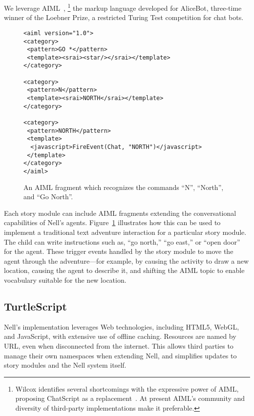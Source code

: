 \documentclass{acm_proc_article-sp}
\begin{document}
We leverage AIML~\cite{aiml:2005},%
\footnote{Wilcox identifies several shortcomings with the expressive
  power of AIML, proposing ChatScript as a
  replacement~\cite{wilcox:2010}.  At present AIML's community and
  diversity of third-party implementations make it preferable.}
the markup language developed for AliceBot, three-time winner of the
Loebner Prize, a restricted Turing Test competition for chat bots.

\begin{figure}
\begin{verbatim}
<aiml version="1.0">
<category>
 <pattern>GO *</pattern>
 <template><srai><star/></srai></template>
</category>

<category>
 <pattern>N</pattern>
 <template><srai>NORTH</srai></template>
</category>

<category>
 <pattern>NORTH</pattern>
 <template>
  <javascript>FireEvent(Chat, "NORTH")</javascript>
 </template>
</category>
</aiml>
\end{verbatim}
\caption{An AIML fragment which recognizes the commands ``N'',
  ``North'', and ``Go North''.}\label{fig:aiml}
\end{figure}
Each story module can include AIML fragments extending the
conversational capabilities of Nell's agents.  Figure~\ref{fig:aiml}
illustrates how this can be used to implement a traditional
text adventure interaction for a particular story module.
The child can write instructions such as, ``go north,'' ``go
east,'' or ``open door'' for the agent.  These trigger events
handled by the story module to move the agent through the
adventure---for example, by causing the activity to draw a
new location, causing the agent to describe it, and shifting the
AIML topic to enable vocabulary suitable for the new location.


\subsection{TurtleScript}\label{sec:turtles}
Nell's implementation leverages Web technologies, including HTML5,
WebGL, and JavaScript, with extensive use of offline caching.
Resources are named by URL, even when disconnected from the
internet.  This allows third parties to manage their own namespaces
when extending Nell, and simplifies updates to story modules and
the Nell system itself.
\end{document}
